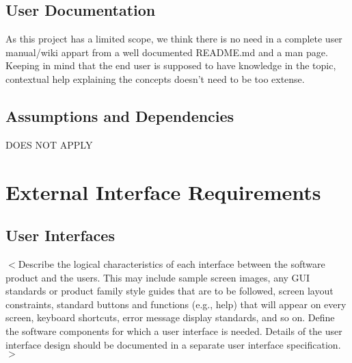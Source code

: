 \documentclass{scrreprt}
\begin{document}
\section{User Documentation}

As this project has a limited scope, we think there is no need in a complete
user manual/wiki appart from a well documented README.md and a man page.\\

Keeping in mind that the end user is supposed to have knowledge in the topic,
contextual help explaining the concepts doesn't need to be too extense.

\section{Assumptions and Dependencies}

DOES NOT APPLY\\



\chapter{External Interface Requirements}

\section{User Interfaces}

$<$Describe the logical characteristics of each interface between the software
product and the users. This may include sample screen images, any GUI standards
or product family style guides that are to be followed, screen layout
constraints, standard buttons and functions (e.g., help) that will appear on
every screen, keyboard shortcuts, error message display standards, and so on.
Define the software components for which a user interface is needed. Details of
the user interface design should be documented in a separate user interface
specification.$>$
\end{document}

